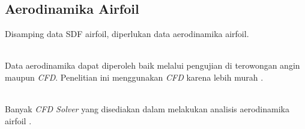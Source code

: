 \subsection{Aerodinamika Airfoil}
\begin{frame}
  Disamping data SDF airfoil, diperlukan data aerodinamika airfoil.\\~\\
  \pause

  Data aerodinamika dapat diperoleh baik melalui pengujian di terowongan angin maupun \textit{CFD}. Penelitian ini menggunakan \textit{CFD} karena lebih murah \cite{eppler2012airfoil}.\\~\\
  \pause

  Banyak \textit{CFD Solver} yang disediakan dalam melakukan analisis aerodinamika airfoil \cite{gunel2016comparison}.
\end{frame}
